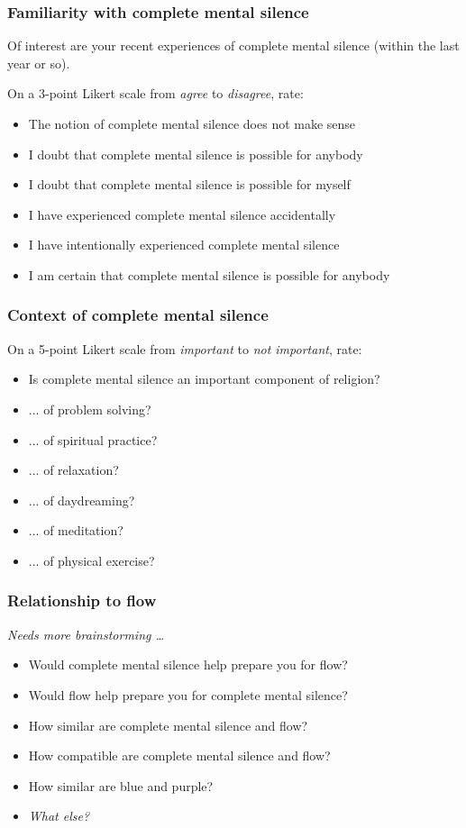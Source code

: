 \documentclass[10pt,utf8x]{beamer}
\begin{document}
\begin{frame}
  \frametitle{Familiarity with complete mental silence}

Of interest are your recent experiences of complete mental silence
(within the last year or so).

On a 3-point Likert scale from \emph{agree} to \emph{disagree}, rate:

\begin{itemize}
\item The notion of complete mental silence does not make sense
\item I doubt that complete mental silence is possible for anybody
\item I doubt that complete mental silence is possible for myself
\item I have experienced complete mental silence accidentally
\item I have intentionally experienced complete mental silence
\item I am certain that complete mental silence is possible for anybody
\end{itemize}

\end{frame}

\begin{frame}
  \frametitle{Context of complete mental silence}

On a 5-point Likert scale from \emph{important} to \emph{not important}, rate:

\begin{itemize}
\item Is complete mental silence an important component of religion?
\item ... of problem solving?
\item ... of spiritual practice?
\item ... of relaxation?
\item ... of daydreaming?
\item ... of meditation?
\item ... of physical exercise?
\end{itemize}

\end{frame}

\begin{frame}
  \frametitle{Relationship to flow}

\emph{Needs more brainstorming \dots}

\begin{itemize}
\item Would complete mental silence help prepare you for flow?
\item Would flow help prepare you for complete mental silence?
\item How similar are complete mental silence and flow?
\item How compatible are complete mental silence and flow?
\item How similar are blue and purple?
\item\emph{What else?}
\end{itemize}

\end{frame}
\end{document}
